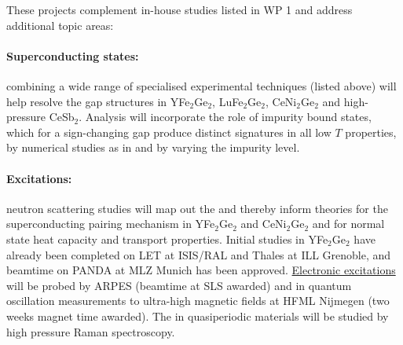 \noindent
These projects complement in-house studies listed in WP 1 and address additional topic areas:
 
\paragraph{Superconducting states:}
combining a wide range of specialised experimental techniques (listed above)  will help resolve the gap structures in YFe$_2$Ge$_2$, LuFe$_2$Ge$_2$, CeNi$_2$Ge$_2$ and high-pressure CeSb$_2$. Analysis will incorporate the role of impurity bound states, which for a sign-changing gap produce distinct signatures in  all low $T$ properties, by numerical studies as in \cite{bang17} and by varying the impurity level.

\paragraph{Excitations:}
neutron scattering studies will map out the  and thereby inform theories for the superconducting pairing mechanism in YFe$_2$Ge$_2$ and CeNi$_2$Ge$_2$ and for normal state heat
capacity \cite{hayden00} and transport properties. 
Initial studies in YFe$_2$Ge$_2$ have already been completed  on LET at ISIS/RAL and Thales at ILL Grenoble, %
and beamtime on PANDA at MLZ Munich has been approved. \ul{Electronic excitations} will be probed by ARPES (beamtime at SLS awarded) and in quantum oscillation measurements to ultra-high magnetic fields at HFML Nijmegen (two weeks magnet time awarded). The  in quasiperiodic materials will be studied by high pressure Raman spectroscopy.

